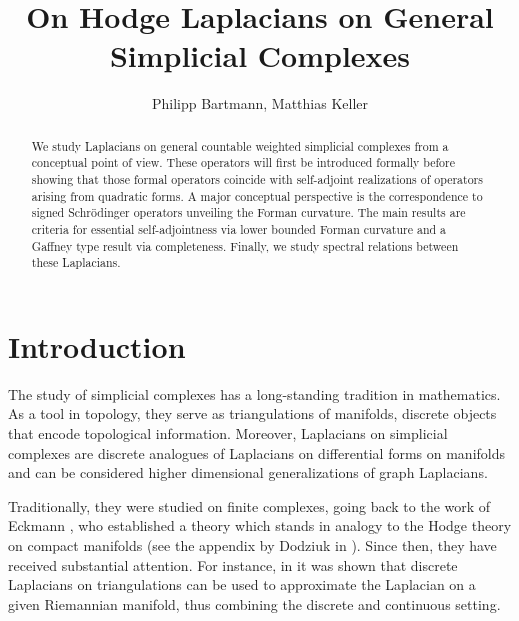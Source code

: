 \documentclass[10pt]{amsart}
\theoremstyle{definition}
\begin{document}
	\author[P. Bartmann, M. Keller]{Philipp Bartmann, Matthias Keller}
	
	\address{Philipp Bartmann, Matthias Keller: Institut f\"ur Mathematik, Universit\"at Potsdam
		14476  Potsdam, Germany}
	
	
	
	
	\title[]{On Hodge Laplacians on General Simplicial Complexes}
	

\begin{abstract}

  \noindent We study Laplacians on general countable weighted simplicial complexes from a conceptual point of view. These operators will first be introduced formally before showing that those formal operators coincide with self-adjoint realizations of operators arising from quadratic forms. A major conceptual perspective is the correspondence to signed Schrödinger operators unveiling the Forman curvature. The main results are criteria for essential self-adjointness via lower bounded Forman curvature and a Gaffney type result via completeness. Finally, we study spectral relations between these Laplacians.
\vspace{0.95cc}
\end{abstract}
\maketitle
\section{Introduction} \label{form}


The study of simplicial complexes has a long-standing tradition in mathematics. As a tool in topology, they serve as triangulations of manifolds, discrete objects that encode topological information. Moreover, Laplacians on simplicial complexes are discrete analogues of Laplacians on differential forms on manifolds and can be considered higher dimensional generalizations of graph Laplacians.

Traditionally, they were studied on finite complexes, going back to the work of Eckmann \cite{Eckmann}, who established a theory which stands in analogy to the Hodge theory on compact manifolds (see the appendix by Dodziuk in \cite{Chavel}). Since then, they have received substantial attention. For instance, in \cite{Dodziuk} it was shown that discrete Laplacians on triangulations can be used to approximate the Laplacian on a given Riemannian manifold, thus combining the discrete and continuous setting.
\end{document}
